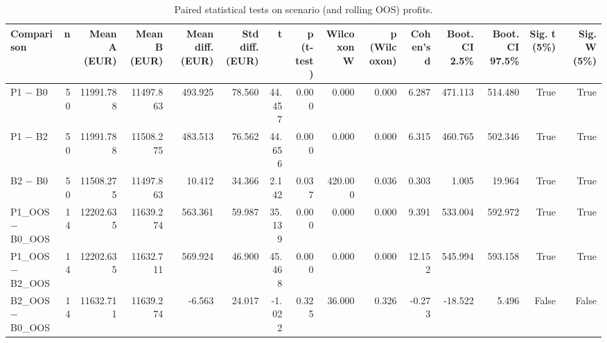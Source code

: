 \begin{table}
\caption{Paired statistical tests on scenario (and rolling OOS) profits.}
\label{tab:stats}
\begin{tabular}{lrrrrrrrrrrrrrr}
\toprule
Comparison & n & Mean A (EUR) & Mean B (EUR) & Mean diff. (EUR) & Std diff. (EUR) & t & p (t-test) & Wilcoxon W & p (Wilcoxon) & Cohen's d & Boot. CI 2.5\% & Boot. CI 97.5\% & Sig. t (5\%) & Sig. W (5\%) \\
\midrule
P1 − B0 & 50 & 11991.788 & 11497.863 & 493.925 & 78.560 & 44.457 & 0.000 & 0.000 & 0.000 & 6.287 & 471.113 & 514.480 & True & True \\
P1 − B2 & 50 & 11991.788 & 11508.275 & 483.513 & 76.562 & 44.656 & 0.000 & 0.000 & 0.000 & 6.315 & 460.765 & 502.346 & True & True \\
B2 − B0 & 50 & 11508.275 & 11497.863 & 10.412 & 34.366 & 2.142 & 0.037 & 420.000 & 0.036 & 0.303 & 1.005 & 19.964 & True & True \\
P1\_OOS − B0\_OOS & 14 & 12202.635 & 11639.274 & 563.361 & 59.987 & 35.139 & 0.000 & 0.000 & 0.000 & 9.391 & 533.004 & 592.972 & True & True \\
P1\_OOS − B2\_OOS & 14 & 12202.635 & 11632.711 & 569.924 & 46.900 & 45.468 & 0.000 & 0.000 & 0.000 & 12.152 & 545.994 & 593.158 & True & True \\
B2\_OOS − B0\_OOS & 14 & 11632.711 & 11639.274 & -6.563 & 24.017 & -1.022 & 0.325 & 36.000 & 0.326 & -0.273 & -18.522 & 5.496 & False & False \\
\bottomrule
\end{tabular}
\end{table}


